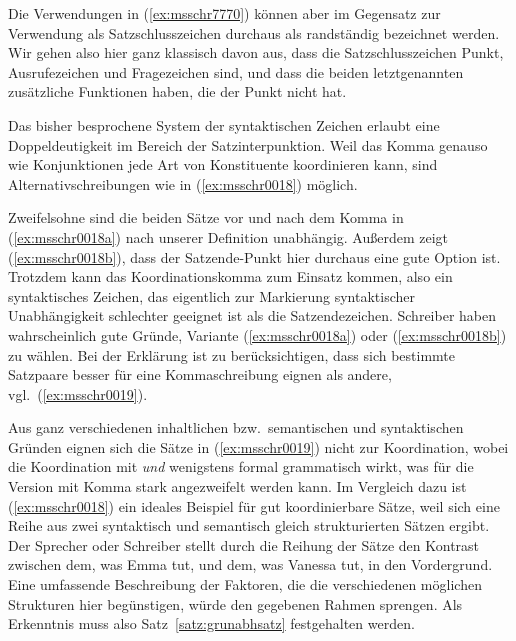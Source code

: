 Die Verwendungen in (\ref{ex:msschr7770}) können aber im Gegensatz zur Verwendung als Satzschlusszeichen durchaus als randständig bezeichnet werden.
Wir gehen also hier ganz klassisch davon aus, dass die Satzschlusszeichen Punkt, Ausrufezeichen und Fragezeichen sind, und dass die beiden letztgenannten zusätzliche Funktionen haben, die der Punkt nicht hat.

Das bisher besprochene System der syntaktischen Zeichen erlaubt eine Doppeldeutigkeit im Bereich der Satzinterpunktion.
Weil das Komma genauso wie Konjunktionen jede Art von Konstituente koordinieren kann, sind Alternativschreibungen wie in (\ref{ex:msschr0018}) möglich.

\begin{exe}
  \ex\label{ex:msschr0018} 
  \begin{xlist}
  \end{xlist}
\end{exe}

Zweifelsohne sind die beiden Sätze vor und nach dem Komma in (\ref{ex:msschr0018a}) nach unserer Definition unabhängig.
Außerdem zeigt (\ref{ex:msschr0018b}), dass der Satzende-Punkt hier durchaus eine gute Option ist.
Trotzdem kann das Koordinationskomma zum Einsatz kommen, also ein syntaktisches Zeichen, das eigentlich zur Markierung syntaktischer Unabhängigkeit schlechter geeignet ist als die Satzendezeichen.
Schreiber haben wahrscheinlich gute Gründe, Variante (\ref{ex:msschr0018a}) oder (\ref{ex:msschr0018b}) zu wählen.
Bei der Erklärung ist zu berücksichtigen, dass sich bestimmte Satzpaare besser für eine Kommaschreibung eignen als andere, vgl.\ (\ref{ex:msschr0019}).

\begin{exe}
  \ex\label{ex:msschr0019} 
  \begin{xlist}
  \end{xlist}
\end{exe}

Aus ganz verschiedenen inhaltlichen bzw.\ semantischen und syntaktischen Gründen eignen sich die Sätze in (\ref{ex:msschr0019}) nicht zur Koordination, wobei die Koordination mit \textit{und} wenigstens formal grammatisch wirkt, was für die Version mit Komma stark angezweifelt werden kann.
Im Vergleich dazu ist (\ref{ex:msschr0018}) ein ideales Beispiel für gut koordinierbare Sätze, weil sich eine Reihe aus zwei syntaktisch und semantisch gleich strukturierten Sätzen ergibt.
Der Sprecher oder Schreiber stellt durch die Reihung der Sätze den Kontrast zwischen dem, was Emma tut, und dem, was Vanessa tut, in den Vordergrund.
Eine umfassende Beschreibung der Faktoren, die die verschiedenen möglichen Strukturen hier begünstigen, würde den gegebenen Rahmen sprengen.
Als Erkenntnis muss also Satz~\ref{satz:grunabhsatz} festgehalten werden.

